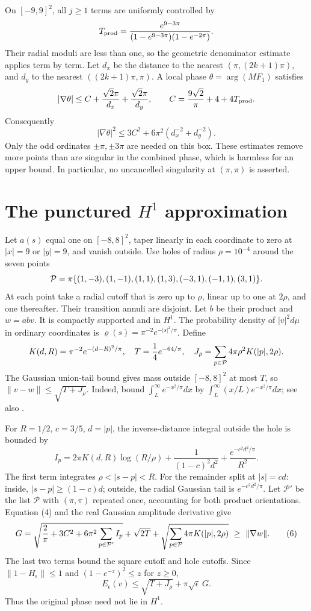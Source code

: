 \documentclass[11pt,a4paper]{article}
\newcommand{\eps}{\epsilon}
\begin{document}
On $[-9,9]^2$, all $j\geq1$ terms are uniformly controlled by
\[
 T_{\rm prod}=
 \frac{e^{9-3\pi}}{(1-e^{9-3\pi})(1-e^{-2\pi})}.
\]
Their radial moduli are less than one, so the geometric denominator
estimate applies term by term. Let $d_x$ be the distance to the
nearest $(\pi,(2k+1)\pi)$, and $d_y$ to the nearest
$((2k+1)\pi,\pi)$. A local phase $\theta=\arg(MF_1)$ satisfies
\[
 |\nabla\theta|\leq C+\frac{\sqrt2\pi}{d_x}
                         +\frac{\sqrt2\pi}{d_y},\qquad
 C=\frac{9\sqrt2}{\pi}+4+4T_{\rm prod}.
\]
Consequently
\[
 |\nabla\theta|^2\leq
 3C^2+6\pi^2(d_x^{-2}+d_y^{-2}). \tag{4}
\]
Only the odd ordinates $\pm\pi,\pm3\pi$ are needed on this box.
These estimates remove more points than are singular in the combined
phase, which is harmless for an upper bound. In particular, no
uncancelled singularity at $(\pi,\pi)$ is asserted.

\newpage
\section{The punctured $H^1$ approximation}
Let $a(s)$ equal one on $[-8,8]^2$, taper linearly in each coordinate
to zero at $|x|=9$ or $|y|=9$, and vanish outside.
Use holes of radius $\rho=10^{-4}$ around the seven points
\[
 {\cal P}=\pi\{(1,-3),(1,-1),(1,1),(1,3),(-3,1),(-1,1),(3,1)\}.
\]
At each point take a radial cutoff that is zero up to $\rho$,
linear up to one at $2\rho$, and one thereafter.
Their transition annuli are disjoint. Let $b$ be their product
and $w=abv$. It is compactly supported and in $H^1$.
The probability density of $|v|^2d\mu$ in ordinary coordinates is
$\varrho(s)=\pi^{-2}e^{-|s|^2/\pi}$. Define
\[
 K(d,R)=\pi^{-2}e^{-(d-R)^2/\pi},\quad
 T=\frac14 e^{-64/\pi},\quad
 J_\rho=\sum_{p\in{\cal P}}4\pi\rho^2K(|p|,2\rho).
\]
The Gaussian union-tail bound gives mass outside $[-8,8]^2$
at most $T$, so $\|v-w\|\leq\sqrt{T+J_\rho}$.
Indeed, bound $\int_L^\infty e^{-x^2/\pi}dx$ by
$\int_L^\infty(x/L)e^{-x^2/\pi}dx$; see also \cite{dlmf}.

For $R=1/2$, $c=3/5$, $d=|p|$, the inverse-distance integral
outside the hole is bounded by
\[
 I_p=
 2\pi K(d,R)\log(R/\rho)
 +\frac1{(1-c)^2d^2}+\frac{e^{-c^2d^2/\pi}}{R^2}. \tag{5}
\]
The first term integrates $\rho<|s-p|<R$.
For the remainder split at $|s|=cd$: inside, $|s-p|\geq(1-c)d$;
outside, the radial Gaussian tail is $e^{-c^2d^2/\pi}$.
Let $\mathcal P'$ be the list $\mathcal P$ with $(\pi,\pi)$ repeated
once, accounting for both product orientations.
Equation (4) and the real Gaussian amplitude derivative give
\[
 G=
 \sqrt{\frac2\pi+3C^2+6\pi^2\sum_{p\in{\cal P}'}I_p}
 +\sqrt{2T}
 +\sqrt{\sum_{p\in{\cal P}}4\pi K(|p|,2\rho)}
 \ \geq\ \|\nabla w\|. \tag{6}
\]
The last two terms bound the square cutoff and hole cutoffs.
Since $\|1-H_\eps\|\leq1$ and $(1-e^{-z})^2\leq z$ for $z\geq0$,
\[
 E_\eps(v)\leq\sqrt{T+J_\rho}+\pi\sqrt\eps\,G. \tag{7}
\]
Thus the original phase need not lie in $H^1$.
\newpage
\end{document}
